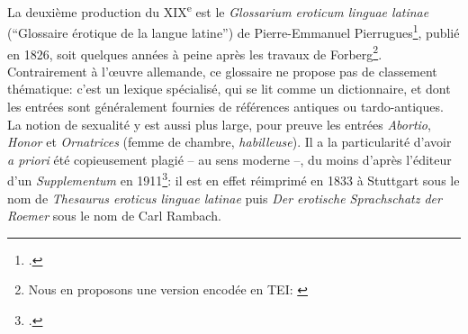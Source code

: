 La deuxième production du XIX\textsuperscript{e} est le \textit{Glossarium eroticum linguae latinae} (\enquote{Glossaire érotique de la langue latine}) de Pierre-Emmanuel Pierrugues\footcite{pierrugues_glossarium_1826}, publié en 1826, soit quelques années à peine après les travaux de Forberg\footnote{Nous en proposons une version encodée en TEI: \textcite{Clerice_Lasciva_Roma_Lexical_2022}}. Contrairement à l'œuvre allemande, ce glossaire ne propose pas de classement thématique: c'est un lexique spécialisé, qui se lit comme un dictionnaire, et dont les entrées sont généralement fournies de références antiques ou tardo-antiques. La notion de sexualité y est aussi plus large, pour preuve les entrées \textit{Abortio}, \textit{Honor} et \textit{Ornatrices} (femme de chambre, \textit{habilleuse}). Il a la particularité d'avoir \textit{a priori} été copieusement plagié -- au sens moderne --, du moins d'après l'éditeur d'un \textit{Supplementum} en 1911\footcite{pierrugues_supplementum_1911}: il est en effet réimprimé en 1833 à Stuttgart sous le nom de \textit{Thesaurus eroticus linguae latinae} puis \textit{Der erotische Sprachschatz der Roemer} sous le nom de Carl Rambach. 

